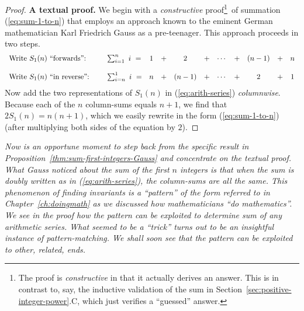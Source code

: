 \begin{proof}
{\bf A textual proof.}
%
We begin with a {\em constructive} proof\footnote{The proof is {\em
    constructive} in that it actually derives an answer.  This is in
  contrast to, say, the inductive validation of the sum in
  Section~\ref{sec:positive-integer-power}.C, which just verifies a
  ``guessed'' answer.}~of summation (\ref{eq:sum-1-to-n}) that employs
an approach known to the eminent German mathematician Karl Friedrich
Gauss  as a pre-teenager.   This approach proceeds in two
steps.
\begin{equation}
\label{eq:arith-series}
\begin{array}{llccccccccc}
\mbox{Write $S_1(n)$ ``forwards'':} &
\hspace*{.2in}\sum_{i=1}^n \ i \ = & 1 & + & 2   & + & \cdots & + & (n-1) & + & n \\
 & & & & & & & & & &  \\
\mbox{Write $S_1(n)$ ``in reverse'':} &
\hspace*{.2in}\sum_{i=n}^1 \ i \ = & n & + & (n-1) & + & \cdots & + & 2   & + & 1
\end{array}
\end{equation}
Now add the two representations of $S_1(n)$ in (\ref{eq:arith-series})
{\em columnwise}.  Because each of the $n$ column-sums equals $n+1$,
we find that $2 S_1(n) = n(n+1)$, which we easily rewrite in the form
(\ref{eq:sum-1-to-n}) (after multiplying both sides of the equation by
$2$).
\end{proof}

\medskip

%
{\em Now is an opportune moment to step back from the specific result
  in Proposition~\ref{thm:sum-first-integers-Gauss} and concentrate on
  the textual proof.  What Gauss noticed about the sum of the first
  $n$ integers is that when the sum is doubly written as in
  (\ref{eq:arith-series}), the column-sums are all the same.  This
  phenomenon of {\em finding invariants} is a ``pattern'' of the form
  referred to in Chapter~\ref{ch:doingmath} as we discussed how
  mathematicians ``do mathematics''.  We see in the proof how the
  pattern can be exploited to determine sum of any arithmetic series.
  {\em What seemed to be a ``trick'' turns out to be an insightful
    instance of pattern-matching.}  We shall soon see that the pattern
  can be exploited to other, related, ends.}

